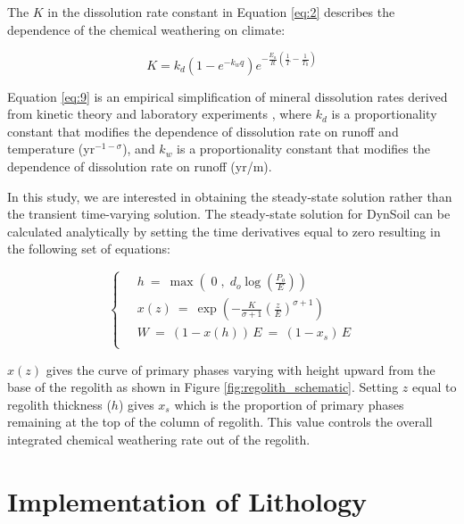 \documentclass[11pt,letterpaper]{article}
\begin{document}
The $K$ in the dissolution rate constant in Equation \ref{eq:2} describes the dependence of the chemical weathering on climate:

\begin{equation}
    K = k_{d}\left(1-e^{-k_{w}q}\right)e^{-\frac{E_{a}}{R}\left(\frac{1}{T}-\frac{1}{T_{0}}\right)}
    \label{eq:9}
\end{equation}

\noindent
Equation \ref{eq:9} is an empirical simplification of mineral dissolution rates derived from kinetic theory and laboratory experiments \citep{West2012a}, where $k_{d}$ is a proportionality constant that modifies the dependence of dissolution rate on runoff and temperature (yr$^{-1-\sigma}$), and $k_{w}$ is a proportionality constant that modifies the dependence of dissolution rate on runoff (yr/m).

In this study, we are interested in obtaining the steady-state solution rather than the transient time-varying solution. The steady-state solution for DynSoil can be calculated analytically by setting the time derivatives equal to zero resulting in the following set of equations:

\begin{equation}\label{eq:dynsoil_ss}
\left\{\ 
\begin{aligned}
& h   \ =\    \max\left(  \;  0  \;,\;  d_o \log\left(\frac{P_o}{E}\right)  \right)                                                 \\
& x(z)      \ =\   \exp\left(   - \frac{K}{\sigma+1}  \left(\frac{z}{E}\right)^{\sigma+1}   \right)   \\
& W        \ =\   (1-x(h)) \, E  \ =\   (1-x_s) \, E                                                                         \\
\end{aligned}
\right.
\end{equation}

\noindent
$x(z)$ gives the curve of primary phases varying with height upward from the base of the regolith as shown in Figure \ref{fig:regolith_schematic}. Setting $z$ equal to regolith thickness ($h$) gives $x_s$ which is the proportion of primary phases remaining at the top of the column of regolith. This value controls the overall integrated chemical weathering rate out of the regolith.

\section*{Implementation of Lithology}
\end{document}
